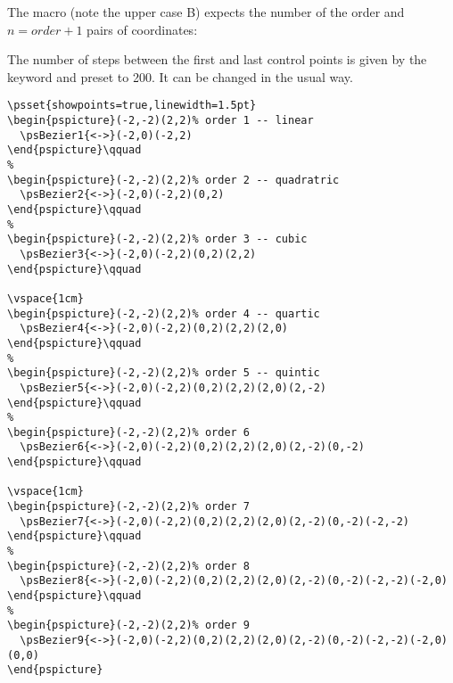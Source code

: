 \documentclass[11pt,english,BCOR10mm,DIV12,bibliography=totoc,parskip=false,
   smallheadings, headexclude,footexclude,oneside]{pst-doc}
\begin{document}
The macro  (note the upper case B) expects the number of the order 
and $n=order+1$ pairs of coordinates:

\begin{BDef}
\Larg{\#}\OptArgs{}\coordn
\end{BDef}

The number of steps between the first and last control points is given
by the keyword  and preset to 200. It can be
changed in the usual way. 


\begin{lstlisting}
\psset{showpoints=true,linewidth=1.5pt}
\begin{pspicture}(-2,-2)(2,2)% order 1 -- linear
  \psBezier1{<->}(-2,0)(-2,2)
\end{pspicture}\qquad
%
\begin{pspicture}(-2,-2)(2,2)% order 2 -- quadratric
  \psBezier2{<->}(-2,0)(-2,2)(0,2)
\end{pspicture}\qquad
%
\begin{pspicture}(-2,-2)(2,2)% order 3 -- cubic
  \psBezier3{<->}(-2,0)(-2,2)(0,2)(2,2)
\end{pspicture}\qquad

\vspace{1cm}
\begin{pspicture}(-2,-2)(2,2)% order 4 -- quartic
  \psBezier4{<->}(-2,0)(-2,2)(0,2)(2,2)(2,0)
\end{pspicture}\qquad
%
\begin{pspicture}(-2,-2)(2,2)% order 5 -- quintic
  \psBezier5{<->}(-2,0)(-2,2)(0,2)(2,2)(2,0)(2,-2)
\end{pspicture}\qquad
%
\begin{pspicture}(-2,-2)(2,2)% order 6
  \psBezier6{<->}(-2,0)(-2,2)(0,2)(2,2)(2,0)(2,-2)(0,-2)
\end{pspicture}\qquad

\vspace{1cm}
\begin{pspicture}(-2,-2)(2,2)% order 7
  \psBezier7{<->}(-2,0)(-2,2)(0,2)(2,2)(2,0)(2,-2)(0,-2)(-2,-2)
\end{pspicture}\qquad
%
\begin{pspicture}(-2,-2)(2,2)% order 8
  \psBezier8{<->}(-2,0)(-2,2)(0,2)(2,2)(2,0)(2,-2)(0,-2)(-2,-2)(-2,0)
\end{pspicture}\qquad
%
\begin{pspicture}(-2,-2)(2,2)% order 9
  \psBezier9{<->}(-2,0)(-2,2)(0,2)(2,2)(2,0)(2,-2)(0,-2)(-2,-2)(-2,0)(0,0)
\end{pspicture}
\end{lstlisting}
\end{document}
